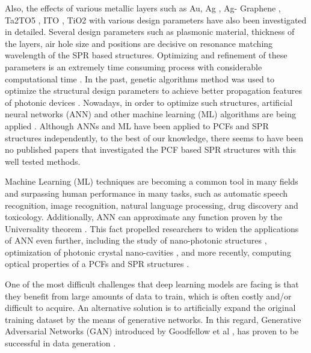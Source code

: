 \documentclass[journal]{IEEEtran}
\begin{document}
Also, the effects of various metallic layers such as Au, Ag \cite{yasli2019multi}, Ag- Graphene \cite{rifat2016highly}, Ta2TO5 \cite{otupiri2015multi}, ITO \cite{dash2014spr}, TiO2 \cite{rifat2016highly} with various design parameters have also been investigated in detailed. Several design parameters such as plasmonic material, thickness of the layers, air hole size and positions are decisive on resonance matching wavelength of the SPR based structures. Optimizing and refinement of these parameters is an extremely time consuming process with considerable computational time \cite{fornarelli2009neural,abdelaziz2012photonic,paper0}. In the past, genetic algorithms \cite{abdelaziz2012photonic,borel2004topology} method was used to optimize the structural design parameters to achieve better propagation features of photonic devices \cite{rifat2016highly}. Nowadays, in order to optimize such structures, artificial neural networks (ANN) and other machine learning (ML) algorithms are being applied \cite{fornarelli2009neural,paper0,hameed2008accurate}. Although ANNs and ML have been applied to PCFs \cite{fornarelli2009neural,paper0} and SPR structures \cite{fu2018optimization,mcatee2019artificial} independently, to the best of our knowledge, there seems to have been no published papers that investigated the PCF based SPR structures with this well tested methods.


Machine Learning (ML) techniques are becoming a common tool in many fields and surpassing human performance in many tasks, such as automatic speech recognition, image recognition, natural language processing, drug discovery and toxicology. Additionally, ANN can approximate any function proven by the Universality theorem  \cite{HORNIK1991251}. This fact propelled researchers to widen the applications of ANN even further, including the study of nano-photonic structures   \cite{kiarashinejad2020knowledge}, optimization of photonic crystal nano-cavities \cite{asano2018optimization}, and more recently, computing optical properties of a PCFs  \cite{paper0} and SPR structures \cite{fu2018optimization,mcatee2019artificial}.

One of the most difficult challenges that deep learning models are facing is that they benefit from large amounts of data to train, which is often costly and/or difficult to acquire. An alternative solution is to artificially expand the original training dataset by the means of generative networks. In this regard, Generative Adversarial Networks (GAN) introduced by Goodfellow et al  \cite{goodfellow2014generative}, has proven to be successful in data generation  \cite{schlegl2017unsupervised,  frid2018synthetic,  perez2017effectiveness}.
\end{document}
